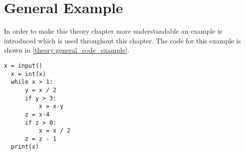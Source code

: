 \section{General Example}
In order to make this theory chapter more understandable an example is introduced which is used throughout this chapter.
The code for this example is shown in \cref{theory:general_code_example}.
\begin{lstlisting}[style=python, caption={The general code example used throughout the theory chapter.}, label={theory:general_code_example}]
  x = input()
  x = int(x)
  while x > 1:
      y = x / 2
      if y > 3:
          x = x-y
      z = x-4
      if z > 0:
          x = x / 2
      z = z - 1
  print(x)
\end{lstlisting}
